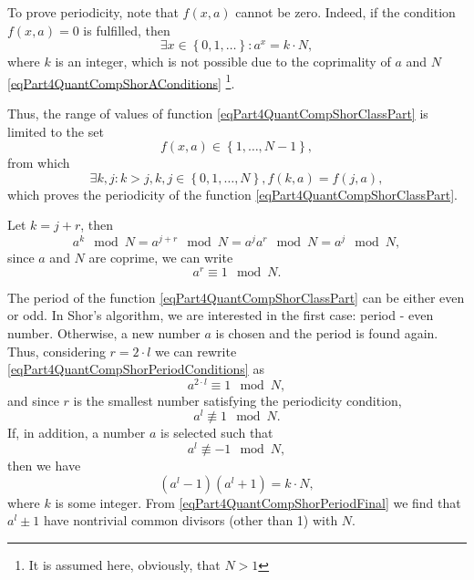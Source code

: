 To prove periodicity, note that $f\left(x, a\right)$ cannot
be zero. Indeed, if the condition
$f\left(x, a\right) = 0$ is fulfilled, then 
\[
\exists x \in \left\{0, 1, \dots\right\}:
a^x = k \cdot N,
\]
where $k$ is an integer, which is not possible due to
the coprimality of $a$ and $N$ \eqref{eqPart4QuantCompShorAConditions}
\footnote{It is assumed here, obviously, that $N > 1$}.

Thus, the range of values of function
\eqref{eqPart4QuantCompShorClassPart} is limited to the set 
\begin{equation}
f\left(x,
a\right) \in \left\{1, \dots, N - 1\right\},
\nonumber
\end{equation}
from which 
\begin{equation}
\exists k,j: k > j, k,j \in \left\{0, 1, \dots, N\right\},
f\left(k,a\right) = f\left(j,a\right),
\nonumber
\end{equation}
which proves the periodicity of the function \eqref{eqPart4QuantCompShorClassPart}.

Let $k = j + r$, then
\[
a^k \mod{N} = a^{j + r} \mod{N} = a^j a^r \mod{N}= a^j \mod{N},
\]
since $a$ and $N$ are coprime, we can write
\begin{equation}
a^r \equiv 1 \mod{N}.
\label{eqPart4QuantCompShorPeriodConditions}
\end{equation}

The period of the function \eqref{eqPart4QuantCompShorClassPart} can be either
even or odd. In Shor's algorithm, we are interested in the first case:
period - even number. Otherwise, a new number $a$ is chosen and
the period is found again. Thus, considering $r= 2\cdot l$ we
can rewrite \eqref{eqPart4QuantCompShorPeriodConditions} as
\begin{equation}
a^{2 \cdot l} \equiv 1 \mod{N},
\nonumber
\end{equation}
and since $r$ is the smallest number satisfying the periodicity condition,
\[
a^{l} \not\equiv 1 \mod{N}.
\]
If, in addition, a number $a$ is selected such that 
\[
a^{l} \not\equiv -1 \mod{N},
\]
then we have 
\begin{equation}
\left(a^l - 1\right)\left(a^l + 1\right) = k \cdot N,
\label{eqPart4QuantCompShorPeriodFinal}
\end{equation}
where $k$ is some integer. From
\eqref{eqPart4QuantCompShorPeriodFinal} we find that $a^l \pm 1$ have
nontrivial common divisors (other than 1) with $N$.

